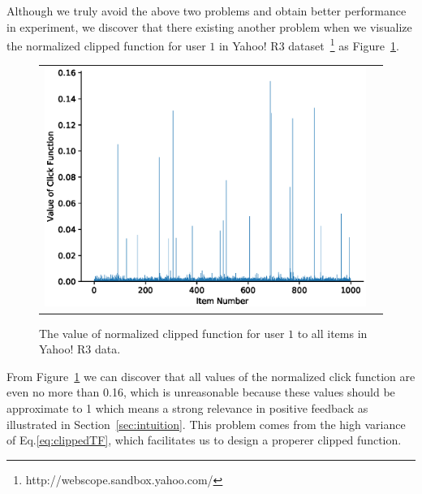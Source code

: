 \documentclass[sigconf]{acmart}
\begin{document}
Although we truly avoid the above two problems and obtain better performance in experiment, we discover that there existing another problem when we visualize the normalized clipped function for user $1$ in Yahoo! R3 dataset~\footnote{http://webscope.sandbox.yahoo.com/} as Figure~\ref{fig:clickFunction}.
\begin{figure}[!htb]
	
	\begin{center}
		
		\begin{tabular}{cc}
			
			\includegraphics[width=\columnwidth]{fig/clickFunction.eps}
			
			
		\end{tabular}
		
	\end{center}
	\caption{The value of normalized clipped function for user $1$ to all items in Yahoo! R3 data.}
	
	\label{fig:clickFunction}
\end{figure} 

From Figure~\ref{fig:clickFunction} we can discover that all values of the normalized click function are even no more than 0.16, which is unreasonable because these values should be approximate to 1 which means a strong relevance in positive feedback as illustrated in Section~\ref{sec:intuition}. This problem comes from the high variance of Eq.\eqref{eq:clippedTF}, which facilitates us to design a properer clipped function.
\end{document}
